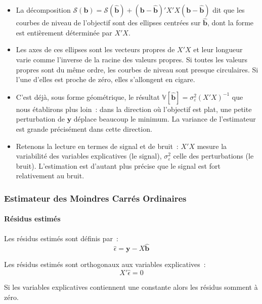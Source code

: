 \documentclass[10pt]{beamer}
\begin{document}
\begin{notes}

  \begin{itemize}

  \item La décomposition $\mathcal S(\mathbf b) = \mathcal S(\hat{\mathbf b}) +
    \left(\mathbf b - \hat{\mathbf b}\right)' X'X \left(\mathbf b - \hat{\mathbf b}\right)$
    dit que les courbes de niveau de l'objectif sont des ellipses centrées
    sur $\hat{\mathbf b}$, dont la forme est entièrement déterminée par $X'X$.\newline

  \item Les axes de ces ellipses sont les vecteurs propres de $X'X$ et leur longueur
    varie comme l'inverse de la racine des valeurs propres. Si toutes les valeurs
    propres sont du même ordre, les courbes de niveau sont presque circulaires. Si
    l'une d'elles est proche de zéro, elles s'allongent en cigare.\newline

  \item C'est déjà, sous forme géométrique, le résultat
    $\mathbb V[\hat{\mathbf b}] = \sigma_{\varepsilon}^2 (X'X)^{-1}$ que nous
    établirons plus loin~: dans la direction où l'objectif est plat, une petite
    perturbation de $\mathbf y$ déplace beaucoup le minimum. La variance de
    l'estimateur est grande précisément dans cette direction.\newline

  \item Retenons la lecture en termes de signal et de bruit~: $X'X$ mesure la
    variabilité des variables explicatives (le signal), $\sigma_{\varepsilon}^2$ celle
    des perturbations (le bruit). L'estimation est d'autant plus précise que le signal
    est fort relativement au bruit.

  \end{itemize}

\end{notes}



\begin{frame}
  \frametitle{Estimateur des Moindres Carrés Ordinaires}
  \framesubtitle{Résidus estimés}

  \begin{defn}{}
    Les résidus estimés sont définis par~:
    \[
      \hat{\epsilon}  = \mathbf y - X \hat{\mathbf b}
    \]
  \end{defn}

  \bigskip

  \begin{prop}\label{prop:orthogonal_residuals}
    Les résidus estimés sont orthogonaux aux variables explicatives~:
    \[
    X'\hat\epsilon = 0
  \]
  \end{prop}

  \bigskip

  \begin{cor}\label{cor:zero_mean_residuals}
    Si les variables explicatives contiennent une constante alors les résidus somment à zéro.
  \end{cor}

\end{frame}
\end{document}

